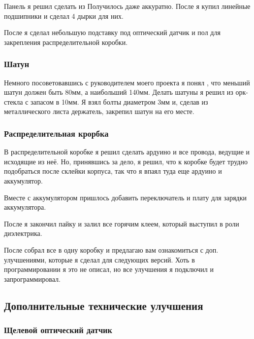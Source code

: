 \documentclass[a4paper, 12pt]{article}
\begin{document}
Панель я решил сделать из  %
Получилось даже аккуратно. После я купил линейные подшипники и сделал 4 дырки
для них.

После я сделал небольшую подставку под оптический датчик и пол для закрепления
распределительной коробки.
\subsubsection{Шатун}

Немного посоветовавшись с руководителем моего проекта я понял , что меньший
шатун должен быть 80мм, а наибольший 140мм. Делать шатуны я решил из орк-стекла
с запасом в 10мм. Я взял болты диаметром 3мм и, сделав из металлического листа
держатель, закрепил шатун на его месте.

\subsubsection{Распределительная крорбка}

В распределительной коробке я решил сделать ардуино и все провода, ведущие и
исходящие из неё. Но, принявшись за дело, я решил, что к коробке будет трудно
подобраться после склейки корпуса, так что я впаял туда еще ардуино и
аккумулятор.

Вместе с аккумулятором пришлось добавить переключатель и плату для зарядки
аккумулятора.

После я закончил пайку и залил все горячим клеем, который выступил в роли
диэлектрика.

После собрал все в одну коробку и предлагаю вам ознакомиться с доп.
улучшениями, которые я сделал для следующих версий. Хоть в программировании я
это не описал, но все улучшения я подключил и запрограммировал.

\subsection{Дополнительные технические улучшения}

\subsubsection{Щелевой оптический датчик}
\end{document}
